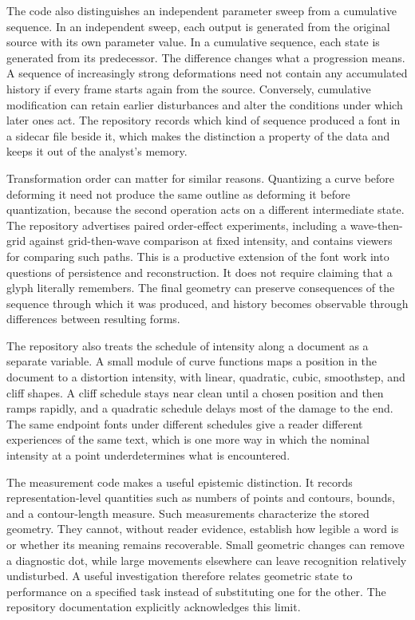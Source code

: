 \documentclass[11pt]{article}
\begin{document}
The code also distinguishes an independent parameter sweep from a cumulative sequence. In an independent sweep, each output is generated from the original source with its own parameter value. In a cumulative sequence, each state is generated from its predecessor. The difference changes what a progression means. A sequence of increasingly strong deformations need not contain any accumulated history if every frame starts again from the source. Conversely, cumulative modification can retain earlier disturbances and alter the conditions under which later ones act. The repository records which kind of sequence produced a font in a sidecar file beside it, which makes the distinction a property of the data and keeps it out of the analyst's memory.

Transformation order can matter for similar reasons. Quantizing a curve before deforming it need not produce the same outline as deforming it before quantization, because the second operation acts on a different intermediate state. The repository advertises paired order-effect experiments, including a wave-then-grid against grid-then-wave comparison at fixed intensity, and contains viewers for comparing such paths. This is a productive extension of the font work into questions of persistence and reconstruction. It does not require claiming that a glyph literally remembers. The final geometry can preserve consequences of the sequence through which it was produced, and history becomes observable through differences between resulting forms.

The repository also treats the schedule of intensity along a document as a separate variable. A small module of curve functions maps a position in the document to a distortion intensity, with linear, quadratic, cubic, smoothstep, and cliff shapes. A cliff schedule stays near clean until a chosen position and then ramps rapidly, and a quadratic schedule delays most of the damage to the end. The same endpoint fonts under different schedules give a reader different experiences of the same text, which is one more way in which the nominal intensity at a point underdetermines what is encountered.

The measurement code makes a useful epistemic distinction. It records representation-level quantities such as numbers of points and contours, bounds, and a contour-length measure. Such measurements characterize the stored geometry. They cannot, without reader evidence, establish how legible a word is or whether its meaning remains recoverable. Small geometric changes can remove a diagnostic dot, while large movements elsewhere can leave recognition relatively undisturbed. A useful investigation therefore relates geometric state to performance on a specified task instead of substituting one for the other. The repository documentation explicitly acknowledges this limit.
\end{document}
